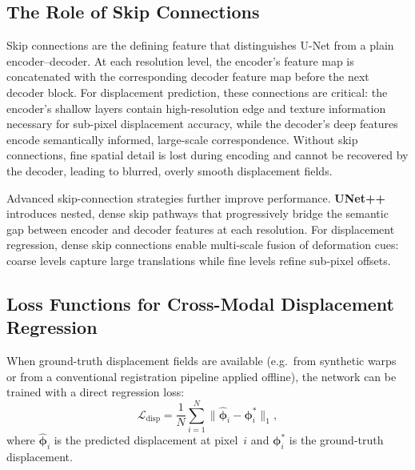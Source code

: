 \subsection{The Role of Skip Connections}

Skip connections are the defining feature that distinguishes U-Net from
a plain encoder--decoder.  At each resolution level, the encoder's
feature map is concatenated with the corresponding decoder feature map
before the next decoder block.  For displacement prediction, these
connections are critical: the encoder's shallow layers contain
high-resolution edge and texture information necessary for sub-pixel
displacement accuracy, while the decoder's deep features encode
semantically informed, large-scale correspondence.  Without skip
connections, fine spatial detail is lost during encoding and cannot be
recovered by the decoder, leading to blurred, overly smooth displacement
fields.

Advanced skip-connection strategies further improve performance.
\textbf{UNet++}~\cite{zhou2018unetpp} introduces nested, dense skip
pathways that progressively bridge the semantic gap between encoder and
decoder features at each resolution.  For displacement regression,
dense skip connections enable multi-scale fusion of deformation cues:
coarse levels capture large translations while fine levels refine
sub-pixel offsets.

\subsection{Loss Functions for Cross-Modal Displacement Regression}

When ground-truth displacement fields are available (e.g.\ from
synthetic warps or from a conventional registration pipeline applied
offline), the network can be trained with a direct regression loss:
\[
    \mathcal{L}_{\text{disp}} = \frac{1}{N}\sum_{i=1}^{N}
        \|\hat{\boldsymbol{\phi}}_i - \boldsymbol{\phi}_i^{*}\|_1,
\]
where $\hat{\boldsymbol{\phi}}_i$ is the predicted displacement at
pixel~$i$ and $\boldsymbol{\phi}_i^{*}$ is the ground-truth
displacement.

